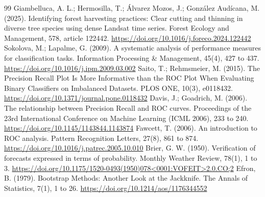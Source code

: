 \documentclass[11pt,a4paper]{article}
\begin{document}
\begin{thebibliography}{99}
 Giambelluca, A. L.; Hermosilla, T.; Álvarez Mozos, J.; González Audícana, M. (2025). Identifying forest harvesting practices: Clear cutting and thinning in diverse tree species using dense Landsat time series. Forest Ecology and Management, 578, article 122442. \url{https://doi.org/10.1016/j.foreco.2024.122442}
 Sokolova, M.; Lapalme, G. (2009). A systematic analysis of performance measures for classification tasks. Information Processing \& Management, 45(4), 427 to 437. \url{https://doi.org/10.1016/j.ipm.2009.03.002}
 Saito, T.; Rehmsmeier, M. (2015). The Precision Recall Plot Is More Informative than the ROC Plot When Evaluating Binary Classifiers on Imbalanced Datasets. PLOS ONE, 10(3), e0118432. \url{https://doi.org/10.1371/journal.pone.0118432}
 Davis, J.; Goadrich, M. (2006). The relationship between Precision Recall and ROC curves. Proceedings of the 23rd International Conference on Machine Learning (ICML 2006), 233 to 240. \url{https://doi.org/10.1145/1143844.1143874}
 Fawcett, T. (2006). An introduction to ROC analysis. Pattern Recognition Letters, 27(8), 861 to 874. \url{https://doi.org/10.1016/j.patrec.2005.10.010}
 Brier, G. W. (1950). Verification of forecasts expressed in terms of probability. Monthly Weather Review, 78(1), 1 to 3. \url{https://doi.org/10.1175/1520-0493(1950)078<0001:VOFEIT>2.0.CO;2}
 Efron, B. (1979). Bootstrap Methods: Another Look at the Jackknife. The Annals of Statistics, 7(1), 1 to 26. \url{https://doi.org/10.1214/aos/1176344552}
\end{thebibliography}
\end{document}

